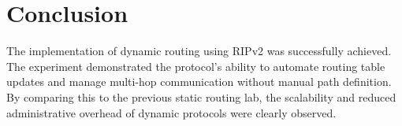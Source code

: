 \documentclass[11pt]{article}
\begin{document}
\section{Conclusion}
The implementation of dynamic routing using RIPv2 was successfully achieved. The experiment demonstrated the protocol's ability to automate routing table updates and manage multi-hop communication without manual path definition. By comparing this to the previous static routing lab, the scalability and reduced administrative overhead of dynamic protocols were clearly observed.


\renewcommand{\bibname}{References}

\end{document}
